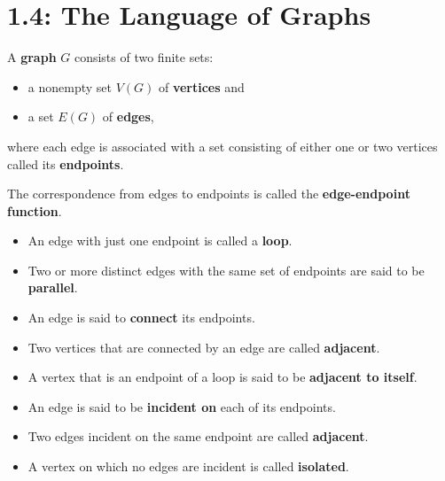 \documentclass[../mathNotesPreamble]{subfiles}
\providecommand{\relscalefact}{1.4}
\begin{document}
\relscale{\relscalefact}
  \section{1.4: The Language of Graphs}
  
  \begin{defn*}
    A \textbf{graph} $G$ consists of two finite sets: 
    \begin{itemize}
      \item a nonempty set $V(G)$ of \textbf{vertices} and
      \item a set $E(G)$ of \textbf{edges},
    \end{itemize}
    where each edge is associated with a set consisting of either one or two vertices called its \textbf{endpoints}.

    The correspondence from edges to endpoints is called the \textbf{edge-endpoint function}.

    \begin{itemize}
      \item An edge with just one endpoint is called a \textbf{loop}.
      \item Two or more distinct edges with the same set of endpoints are said to be \textbf{parallel}.
      \item An edge is said to \textbf{connect} its endpoints.
      \item Two vertices that are connected by an edge are called \textbf{adjacent}.
      \item A vertex that is an endpoint of a loop is said to be \textbf{adjacent to itself}.
      \item An edge is said to be \textbf{incident on} each of its endpoints.
      \item Two edges incident on the same endpoint are called \textbf{adjacent}.
      \item A vertex on which no edges are incident is called \textbf{isolated}.
    \end{itemize}
  \end{defn*}
  \pagebreak
  
\end{document}
